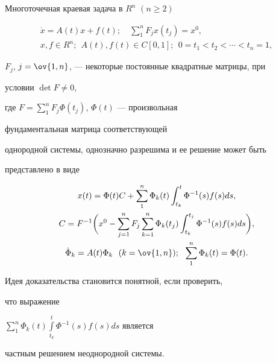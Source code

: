 \begin{lemnonum} 


Многоточечная краевая задача в $R^n$ $(n\ge2)$ 


\begin{gather*} 


\Dot x=A(t)x+f(t);\quad 


\sum^n_1 F_j x(t_j)=x^0, \\ 


% 


x,f\in R^n;\ \ A(t),f(t)\in C[0,1]; 


\ \ 0=t_1<t_2<\dotsb<t_n=1, 


\end{gather*} 


$F_j$, $j=\ov{1,n}$, --- некоторые постоянные квадратные матрицы, при 


условии $\det F\ne0$, 


где $F=\sum\limits^n_1 F_j\Phi(t_j)$, $\Phi(t)$ --- произвольная 


фундаментальная матрица соответствующей 


однородной системы, однозначно разрешима и ее решение может быть 


представлено в виде 


\begin{gather*} 


x(t)=\Phi(t)C+\sum^n_1\Phi_k(t)\int^t_{t_k} 


\Phi^{-1}(s)f(s)d s, \\ 


% 


C=F^{-1}\bigg(x^0-\sum^n_{j=1}F_j\sum^n_{k=1}\Phi_k(t_j) 


\int^{t_j}_{t_k}\Phi^{-1}(s)f(s)d s\bigg), \\ 


\Dot\Phi_k=A(t)\Phi_k\ \ (k=\ov{1,n}); 


\ \ \sum^n_1\Phi_k(t)=\Phi(t). 


\end{gather*} 


\end{lemnonum} 


 


\noindent{}Идея доказательства становится понятной, если проверить,


что выражение 


$\sum\limits^n_1\Phi_k(t)\int\limits^t_{t_k}\Phi^{-1}(s)f(s)d s$ является 


частным решением неоднородной системы. 


